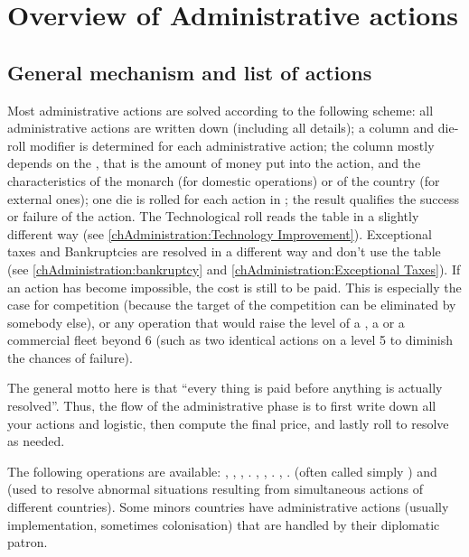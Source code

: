 

\aparag[Sequence.]
\AdminDetails

\section{Overview of Administrative actions}

\subsection{General mechanism and list of actions}

\aparag[Mechanism] Most administrative actions are solved according to the
following scheme: all administrative actions are written down (including all
details); a column and die-roll modifier is determined for each administrative
action; the column mostly depends on the , that is the
amount of money put into the action, and the characteristics of the monarch
(for domestic operations) or of the country (for external ones); one die is
rolled for each action in ; the result
qualifies the success or failure of the action.
\bparag The Technological roll reads the table in a slightly different way
(see \ref{chAdministration:Technology Improvement}).
\bparag Exceptional taxes and Bankruptcies are resolved in a different way and
don't use the table (see \ref{chAdministration:bankruptcy}
and \ref{chAdministration:Exceptional Taxes}).
\bparag If an action has become impossible, the cost is still to be paid. This
is especially the case for competition (because the target of the competition
can be eliminated by somebody else), or any operation that would raise the
level of a \COL, a \TP or a commercial fleet beyond 6 (such as two identical
actions on a level 5 \COL to diminish the chances of failure).

\aparag The general motto here is that ``every thing is paid before anything
is actually resolved''.
\bparag Thus, the flow of the administrative phase is to first write down all
your actions and logistic, then compute the final price, and lastly roll to
resolve as needed.

\label{chAdministration:Administrative Actions}
The following operations are available:
\bparag[Bankruptcies.]
 , , , .
 ,
, .
 ,
.
\bparag[Competitions:]  (often called simply
) and  (used to resolve
abnormal situations resulting from simultaneous actions of different
countries).
 Some minors countries have administrative
actions (usually \TradeFLEET implementation, sometimes colonisation) that are
handled by their diplomatic patron.

